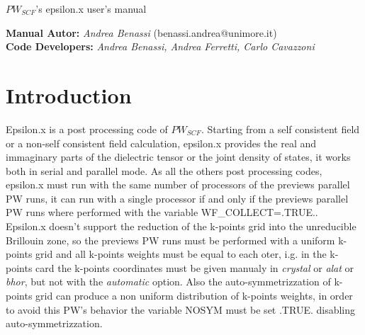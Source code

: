 \documentclass[twocolumn]{article}
\begin{document}
\begin{titlepage}
\Huge
\begin{center}
$PW_{SCF}$'s epsilon.x user's manual\\[6cm]
\normalsize
\begin{figure}[h]
\centering
{}
\label{logo}
\end{figure}
\vspace{6cm}
\textbf{Manual Autor:}
\emph{Andrea Benassi} (benassi.andrea@unimore.it)\\[0.5cm]
\textbf{Code Developers:}
\emph{Andrea Benassi, Andrea Ferretti, Carlo Cavazzoni}
\end{center}
\end{titlepage}
\newpage
\section{Introduction}
Epsilon.x is a post processing code of $PW_{SCF}$. Starting from a self consistent field or a non-self consistent field calculation,
epsilon.x provides the real and immaginary parts of the dielectric tensor or the joint density of states, it works both in serial and
parallel mode. As all the others post processing codes, epsilon.x must run with the same number of
processors of the previews parallel PW runs, it can run with a single processor if and only if the previews parallel PW runs where
performed with the
variable WF\_COLLECT=.TRUE..\\
Epsilon.x doesn't support the reduction of the k-points grid into the unreducible Brillouin zone, so the previews PW runs must be 
performed with a uniform k-points grid and all k-points weights must be equal to each oter, i.g. in the k-points card the k-points
coordinates must be given manualy in \emph{crystal} or \emph{alat} or \emph{bhor}, but not with the \emph{automatic} option. Also the 
auto-symmetrizzation of k-points grid can produce a non uniform distribution of k-points weights, in order to avoid this
PW's behavior the variable NOSYM must be set .TRUE. disabling auto-symmetrizzation.
\end{document}
